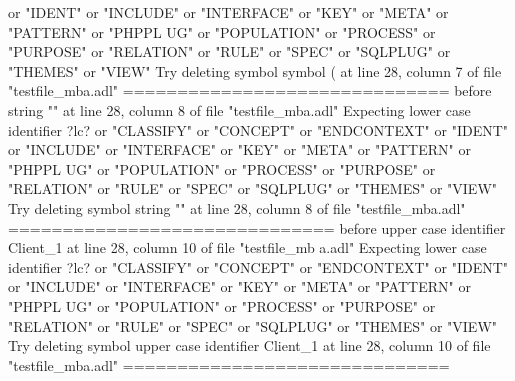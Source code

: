 {  or "IDENT" or "INCLUDE" or "INTERFACE" or "KEY" or "META" or "PATTERN" or "PHPPL\newline
  UG" or "POPULATION" or "PROCESS" or "PURPOSE" or "RELATION" or "RULE" or "SPEC"\newline
  or "SQLPLUG" or "THEMES" or "VIEW"\newline
  Try deleting symbol symbol ( at line 28, column 7 of file "testfile\_mba.adl"\newline
  \newline
  ==============================\newline
  \newline
  before string "" at line 28, column 8 of file "testfile\_mba.adl"\newline
  Expecting lower case identifier ?lc? or "CLASSIFY" or "CONCEPT" or "ENDCONTEXT"\newline
  or "IDENT" or "INCLUDE" or "INTERFACE" or "KEY" or "META" or "PATTERN" or "PHPPL\newline
  UG" or "POPULATION" or "PROCESS" or "PURPOSE" or "RELATION" or "RULE" or "SPEC"\newline
  or "SQLPLUG" or "THEMES" or "VIEW"\newline
  Try deleting symbol string "" at line 28, column 8 of file "testfile\_mba.adl"\newline
  \newline
  ==============================\newline
  \newline
  before upper case identifier Client\_1 at line 28, column 10 of file "testfile\_mb\newline
  a.adl"\newline
  Expecting lower case identifier ?lc? or "CLASSIFY" or "CONCEPT" or "ENDCONTEXT"\newline
  or "IDENT" or "INCLUDE" or "INTERFACE" or "KEY" or "META" or "PATTERN" or "PHPPL\newline
  UG" or "POPULATION" or "PROCESS" or "PURPOSE" or "RELATION" or "RULE" or "SPEC"\newline
  or "SQLPLUG" or "THEMES" or "VIEW"\newline
  Try deleting symbol upper case identifier Client\_1 at line 28, column 10 of file\newline
   "testfile\_mba.adl"\newline
  \newline
  ==============================\newline
  \newline
}
